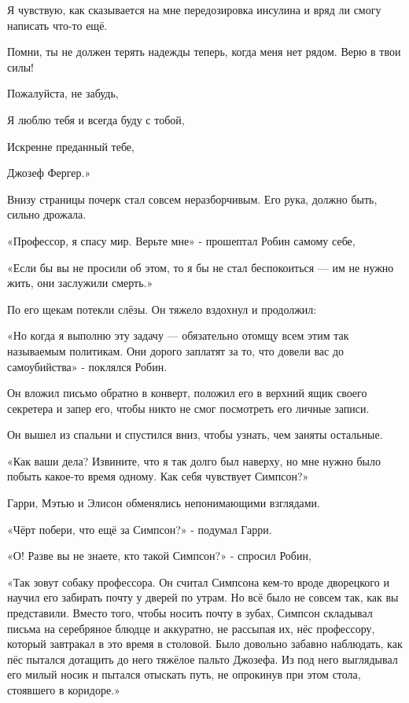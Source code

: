 \documentclass[a5paper, 9pt,
final, openany, twoside=true]{memoir}
\begin{document}
Я чувствую, как сказывается на мне передозировка инсулина и вряд ли смогу написать что-то ещё.

Помни, ты не должен терять надежды теперь, когда меня нет рядом. Верю в твои силы!\bigskip

Пожалуйста, не забудь,\bigskip

Я люблю тебя и всегда буду с тобой,\bigskip

Искренне преданный тебе,\bigskip

Джозеф Фергер.»\bigskip

Внизу страницы почерк стал совсем неразборчивым. Его рука, должно быть, сильно дрожала.

«Профессор, я спасу мир. Верьте мне» - прошептал Робин самому себе,

«Если бы вы не просили об этом, то я бы не стал беспокоиться — им не нужно жить, они заслужили смерть.»

По его щекам потекли слёзы. Он тяжело вздохнул и продолжил:

«Но когда я выполню эту задачу — обязательно отомщу всем этим так называемым политикам. Они дорого заплатят за то, что довели вас до самоубийства» - поклялся Робин.

Он вложил письмо обратно в конверт, положил его в верхний ящик своего секретера и запер его, чтобы никто не смог посмотреть его личные записи.

Он вышел из спальни и спустился вниз, чтобы узнать, чем заняты остальные.

«Как ваши дела? Извините, что я так долго был наверху, но мне нужно было побыть какое-то время одному. Как себя чувствует Симпсон?»

Гарри, Мэтью и Элисон обменялись непонимающими взглядами.

«Чёрт побери, что ещё за Симпсон?» - подумал Гарри.

«О! Разве вы не знаете, кто такой Симпсон?» - спросил Робин,

«Так зовут собаку профессора. Он считал Симпсона кем-то вроде дворецкого и научил его забирать почту у дверей по утрам. Но всё было не совсем так, как вы представили. Вместо того, чтобы носить почту в зубах, Симпсон складывал письма на серебряное блюдце и аккуратно, не рассыпая их, нёс профессору, который завтракал в это время в столовой. Было довольно забавно наблюдать, как пёс пытался дотащить до него тяжёлое пальто Джозефа. Из под него выглядывал его милый носик и пытался отыскать путь, не опрокинув при этом стола, стоявшего в коридоре.»
\end{document}
